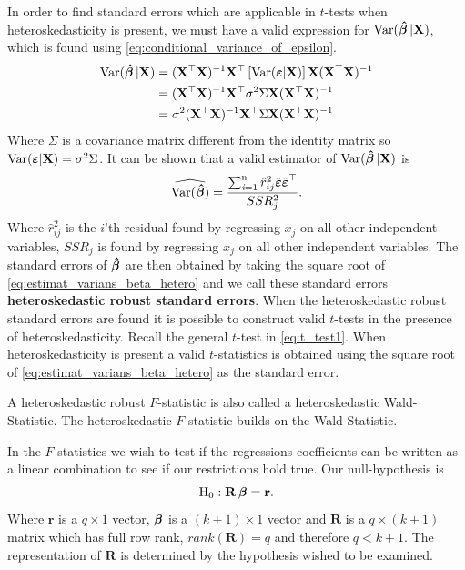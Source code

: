 In order to find standard errors which are applicable in $t$-tests when heteroskedasticity is present, we must have a valid expression for $\operatorname{\text{Var}}(\operatorname{\boldsymbol{\hat{\beta}}}|\textbf{X})$, which is found using \eqref{eq:conditional_variance_of_epsilon}. 
\begin{align*}
   \operatorname{\text{Var}}(\operatorname{\boldsymbol{\hat{\beta}}}|\mathbf{X}) &= (\mathbf{X}^\top\mathbf{X})^{-1}\mathbf{X}^\top\left[ \operatorname{\text{Var}}(\boldsymbol{\varepsilon} | \mathbf{X}) \right] \mathbf{X}(\mathbf{X}^\top\mathbf{X})^{-1}\\
   &= (\mathbf{X}^\top \mathbf{X})^{-1}\mathbf{X}^\top \sigma^2 \Sigma \mathbf{X}(\mathbf{X}^\top \mathbf{X})^{-1}\\
   &= \sigma^2 (\mathbf{X}^\top \mathbf{X})^{-1}\mathbf{X}^\top \Sigma \mathbf{X} (\mathbf{X}^\top \mathbf{X})^{-1}
\end{align*}
Where $\Sigma$ is a covariance matrix different from the identity matrix so $\operatorname{\text{Var}}(\boldsymbol{\varepsilon}|\textbf{X}) = \sigma^2 \Sigma$. It can be shown that a valid estimator of $\operatorname{\text{Var}}(\operatorname{\boldsymbol{\hat{\beta}}}|\textbf{X})$ is
\begin{align}\label{eq:estimat_varians_beta_hetero}
    \widehat{\operatorname{\text{Var}}(\operatorname{\boldsymbol{\hat{\beta}}})} = \dfrac{\operatorname{\sum_{\textit{i}=1}^n} \hat{r}^2_{ij} \hat{\boldsymbol{\varepsilon}}\hat{\boldsymbol{\varepsilon}}^\top}{SSR_j^2}. 
\end{align}
Where $\hat{r}^2_{ij}$ is the $i$'th residual found by regressing $x_j$ on all other independent variables, $SSR_j$ is found by regressing $x_j$ on all other independent variables. 
The standard errors of $\operatorname{\boldsymbol{\hat{\beta}}}$ are then obtained by taking the square root of \eqref{eq:estimat_varians_beta_hetero} and we call these standard errors \textbf{heteroskedastic robust standard errors}. 
When the heteroskedastic robust standard errors are found it is possible to construct valid $t$-tests in the presence of heteroskedasticity. 
Recall the general $t$-test in \eqref{eq:t_test1}. When heteroskedasticity is present a valid $t$-statistics is obtained using the square root of \eqref{eq:estimat_varians_beta_hetero} as the standard error. 

A heteroskedastic robust $F$-statistic is also called a heteroskedastic Wald-Statistic. The heteroskedastic $F$-statistic builds on the Wald-Statistic. 

In the $F$-statistics we wish to test if the regressions coefficients can be written as a linear combination to see if our restrictions hold true. Our null-hypothesis is
\begin{align*}
    \mathrm{H}_0 : \mathbf{R}\operatorname{\boldsymbol{\beta}} = \mathbf{r}. 
\end{align*}
Where $\mathbf{r}$ is a $q \times 1$ vector, $\operatorname{\boldsymbol{\beta}}$ is a $(k+1) \times 1$ vector and $\mathbf{R}$ is a $q \times (k+1)$ matrix which has full row rank, $rank(\mathbf{R}) = q$ and therefore $q < k+1$. The representation of $\mathbf{R}$ is determined by the hypothesis wished to be examined. 

